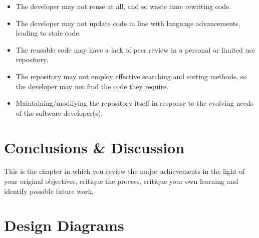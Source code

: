 \documentclass[11pt,openright,a4paper]{report}
\begin{document}
\begin{itemize}
\item The developer may not reuse at all, and so waste time rewriting code.
\item The developer may not update code in line with language advancements, leading to stale code. 
\item The reusable code may have a lack of peer review in a personal or limited use repository.
\item The repository may not employ effective searching and sorting methods, so the developer may not find the code they require.
\item Maintaining/modifying the repository itself in response to the evolving needs of the software developer(s). 
\end{itemize}
















\chapter{Conclusions \& Discussion}
%

This is the chapter in which you review the major achievements in the
light of your original objectives, critique the process, critique your
own learning and identify possible future work.





\appendix


 \label{appendixusabilitystudy}








\chapter{Design Diagrams}
\end{document}
